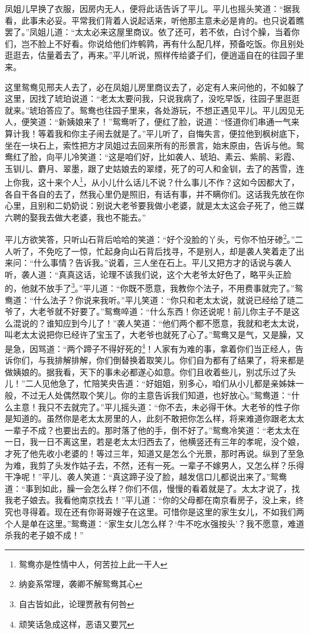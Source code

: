 \documentclass[12pt,oneside]{book}
\begin{document}
凤姐儿早换了衣服，因房内无人，便将此话告诉了平儿。平儿也摇头笑道：“据我看，此事未必妥。平常我们背着人说起话来，听他那主意未必是肯的。也只说着瞧罢了。”凤姐儿道：“太太必来这屋里商议。依了还可，若不依，白讨个臊，当着你们，岂不脸上不好看。你说给他们炸鹌鹑，再有什么配几样，预备吃饭。你且别处逛逛去，估量着去了，再来。”平儿听说，照样传给婆子们，便逍遥自在的往园子里来。

这里鸳鸯见邢夫人去了，必在凤姐儿房里商议去了，必定有人来问他的，不如躲了这里，因找了琥珀说道：“老太太要问我，只说我病了，没吃早饭，往园子里逛逛就来。”琥珀答应了。鸳鸯也往园子里来，各处游玩，不想正遇见平儿。平儿因见无人，便笑道：“新姨娘来了！”鸳鸯听了，便红了脸，说道：“怪道你们串通一气来算计我！等着我和你主子闹去就是了。”平儿听了，自悔失言，便拉他到枫树底下，坐在一块石上，索性把方才凤姐过去回来所有的形景言，始末原由，告诉与他。鸳鸯红了脸，向平儿冷笑道：“这是咱们好，比如袭人、琥珀、素云、紫鹃、彩霞、玉钏儿、麝月、翠墨，跟了史姑娘去的翠缕，死了的可人和金钏，去了的茜雪，连上你我，这十来个人\footnote{鸳鸯亦是性情中人，何苦拉上此一干人}，从小儿什么话儿不说？什么事儿不作？这如今因都大了，各自干各自的去了，然我心里仍是照旧，有话有事，并不瞒你们。这话我先放在你心里，且别和二奶奶说：别说大老爷要我做小老婆，就是太太这会子死了，他三媒六聘的娶我去做大老婆，我也不能去。”

平儿方欲笑答，只听山石背后哈哈的笑道：“好个没脸的丫头，亏你不怕牙碜\footnote{纳妾系常理，袭卿不解鸳鸯其心}。”二人听了，不免吃了一惊，忙起身向山石背后找寻，不是别人，却是袭人笑着走了出来问：“什么事情？告诉我。”说着，三人坐在石上。平儿又把方才的话说与袭人听，袭人道：“真真这话，论理不该我们说，这个大老爷太好色了，略平头正脸的，他就不放手了\footnote{自古皆如此，论理贾赦有何咎}。”平儿道：“你既不愿意，我教你个法子，不用费事就完了。”鸳鸯道：“什么法子？你说来我听。”平儿笑道：“你只和老太太说，就说已经给了琏二爷了，大老爷就不好要了。”鸳鸯啐道：“什么东西！你还说呢！前儿你主子不是这么混说的？谁知应到今儿了！”袭人笑道：“他们两个都不愿意，我就和老太太说，叫老太太说把你已经许了宝玉了，大老爷也就死了心了。”鸳鸯又是气，又是臊，又是急，因骂道：“两个蹄子不得好死的\footnote{顽笑话急成这样，恶语又要咒}！人家有为难的事，拿着你们当正经人，告诉你们，与我排解排解，你们倒替换着取笑儿。你们自为都有了结果了，将来都是做姨娘的。据我看，天下的事未必都遂心如意。你们且收着些儿，别忒乐过了头儿！”二人见他急了，忙陪笑央告道：“好姐姐，别多心，咱们从小儿都是亲姊妹一般，不过无人处偶然取个笑儿。你的主意告诉我们知道，也好放心。”鸳鸯道：“什么主意！我只不去就完了。”平儿摇头道：“你不去，未必得干休。大老爷的性子你是知道的。虽然你是老太太房里的人，此刻不敢把你怎么样，将来难道你跟老太太一辈子不成？也要出去的。那时落了他的手，倒不好了。”鸳鸯冷笑道：“老太太在一日，我一日不离这里，若是老太太归西去了，他横竖还有三年的孝呢，没个娘，才死了他先收小老婆的！等过三年，知道又是怎么个光景，那时再说。纵到了至急为难，我剪了头发作姑子去，不然，还有一死。一辈子不嫁男人，又怎么样？乐得干净呢！”平儿、袭人笑道：“真这蹄子没了脸，越发信口儿都说出来了。”鸳鸯道：“事到如此，臊一会怎么样？你们不信，慢慢的看着就是了。太太才说了，找我老子娘去。我看他南京找去！”平儿道：“你的父母都在南京看房子，没上来，终究也寻得着。现在还有你哥哥嫂子在这里。可惜你是这里的家生女儿，不如我们两个人是单在这里。”鸳鸯道：“家生女儿怎么样？‘牛不吃水强按头’？我不愿意，难道杀我的老子娘不成！”
\end{document}
